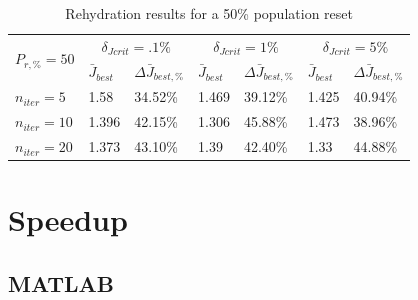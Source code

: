 \begin{table}[H]
    \centering
    \begin{tabular}{lll|ll|ll}
      \toprule
      \multirow{2}{*}{$P_{r,\text{\%}} = 50$} &
        \multicolumn{2}{c}{$\delta_{Jcrit} = .1\%$ } &
        \multicolumn{2}{c}{$\delta_{Jcrit} = 1\%$ } &
        \multicolumn{2}{c}{$\delta_{Jcrit} = 5\%$ } \\
        \cmidrule{2-7}
      & $\bar{J}_{best}$ & $\Delta \bar{J}_{best,\text{\%}}$ & $\bar{J}_{best}$ & $\Delta \bar{J}_{best,\text{\%}}$ & $\bar{J}_{best}$ & $\Delta \bar{J}_{best,\text{\%}}$ \\
      \midrule

      $n_{iter}=5$ & 1.58 & 34.52\% & 1.469 & 39.12\% & 1.425 & 40.94\% \\
      $n_{iter}=10$ & 1.396 & 42.15\% & 1.306 & 45.88\% & 1.473 & 38.96\% \\
      $n_{iter}=20$ & 1.373 & 43.10\% & 1.39 & 42.40\% & 1.33 & 44.88\% \\
      \bottomrule
    \end{tabular}
    \caption{Rehydration results for a 50\% population reset}
    \label{tab:rehydation-p50}
  \end{table}

\section{Speedup}

\subsection{MATLAB}

